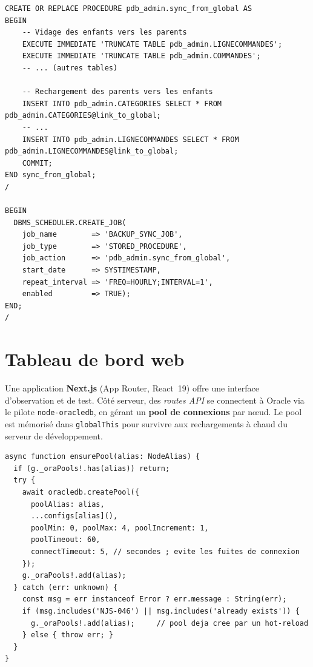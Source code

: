 \documentclass[11pt,a4paper]{article}
\begin{document}
\begin{lstlisting}[style=sql,caption={Procédure de resynchronisation et job horaire (extrait de \texttt{04\_create\_sync\_job.sql}).},label={lst:backup}]
CREATE OR REPLACE PROCEDURE pdb_admin.sync_from_global AS
BEGIN
    -- Vidage des enfants vers les parents
    EXECUTE IMMEDIATE 'TRUNCATE TABLE pdb_admin.LIGNECOMMANDES';
    EXECUTE IMMEDIATE 'TRUNCATE TABLE pdb_admin.COMMANDES';
    -- ... (autres tables)

    -- Rechargement des parents vers les enfants
    INSERT INTO pdb_admin.CATEGORIES SELECT * FROM pdb_admin.CATEGORIES@link_to_global;
    -- ...
    INSERT INTO pdb_admin.LIGNECOMMANDES SELECT * FROM pdb_admin.LIGNECOMMANDES@link_to_global;
    COMMIT;
END sync_from_global;
/

BEGIN
  DBMS_SCHEDULER.CREATE_JOB(
    job_name        => 'BACKUP_SYNC_JOB',
    job_type        => 'STORED_PROCEDURE',
    job_action      => 'pdb_admin.sync_from_global',
    start_date      => SYSTIMESTAMP,
    repeat_interval => 'FREQ=HOURLY;INTERVAL=1',
    enabled         => TRUE);
END;
/
\end{lstlisting}

\section{Tableau de bord web}

Une application \textbf{Next.js} (App Router, React~19) offre une interface
d'observation et de test. Côté serveur, des \emph{routes API} se connectent à
Oracle via le pilote \texttt{node-oracledb}, en gérant un \textbf{pool de
connexions} par nœud. Le pool est mémorisé dans \texttt{globalThis} pour
survivre aux rechargements à chaud du serveur de développement.

\begin{lstlisting}[style=ts,caption={Gestion d'un pool de connexions par nœud (extrait de \texttt{lib/oracle.ts}).},label={lst:pool}]
async function ensurePool(alias: NodeAlias) {
  if (g._oraPools!.has(alias)) return;
  try {
    await oracledb.createPool({
      poolAlias: alias,
      ...configs[alias](),
      poolMin: 0, poolMax: 4, poolIncrement: 1,
      poolTimeout: 60,
      connectTimeout: 5, // secondes ; evite les fuites de connexion
    });
    g._oraPools!.add(alias);
  } catch (err: unknown) {
    const msg = err instanceof Error ? err.message : String(err);
    if (msg.includes('NJS-046') || msg.includes('already exists')) {
      g._oraPools!.add(alias);     // pool deja cree par un hot-reload
    } else { throw err; }
  }
}
\end{lstlisting}
\end{document}
